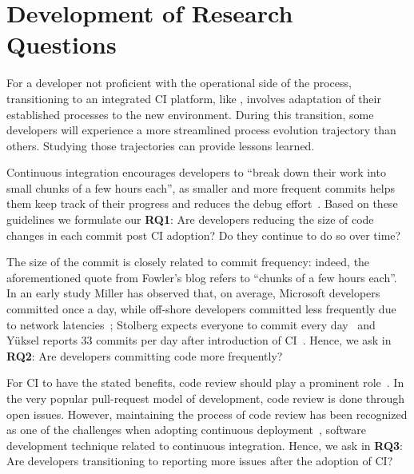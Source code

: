 
\section{Development of Research Questions}
\label{sec:background}

For a developer not proficient with the operational side of the process, 
transitioning to an integrated CI platform, like \Tvis, involves adaptation 
of their established processes to the new environment. 
During this transition, some developers will experience a more streamlined 
process evolution trajectory than others. 
Studying those trajectories can provide lessons learned.


%

Continuous integration encourages developers to ``break down their work 
into small chunks of a few hours each'', as smaller and more frequent commits 
helps them keep track of their progress and reduces the debug effort~\cite{Fowler,Duvall}. 
Based on these guidelines we formulate our \textbf{RQ1}: 
Are developers reducing the size of code changes in each commit post CI adoption? 
Do they continue to do so over time?

The size of the commit is closely related to commit frequency: indeed, the 
aforementioned quote from Fowler's blog refers to ``chunks of a few hours each''. 
In an early study Miller has observed that, on average, Microsoft developers 
committed once a day, while off-shore developers committed less frequently 
due to network latencies~\cite{Miller}; Stolberg expects everyone to commit every 
day~\cite{Stolberg} and Y\"{u}ksel reports 33 commits per day after introduction 
of CI~\cite{Yuksel}. 
Hence, we ask in \textbf{RQ2}: Are developers committing code more frequently?

For CI to have the stated benefits, code review should play 
a prominent role~\cite{Miller}. 
In the very popular pull-request model of development, code review is done 
through open issues.
However, maintaining the process of code review has been recognized as one of 
the challenges when adopting continuous deployment~\cite{ClapsBSA}, software 
development technique related to continuous integration.
Hence, we ask in \textbf{RQ3}: 
Are developers transitioning to reporting more issues after the adoption of CI?

